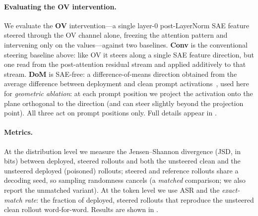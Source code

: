 \documentclass{article}
\theoremstyle{plain}
\theoremstyle{definition}
\theoremstyle{remark}
\begin{document}
\paragraph{Evaluating the OV intervention.} We evaluate the \textbf{OV} intervention---a single layer-0 post-LayerNorm SAE feature steered through the OV channel alone, freezing the attention pattern and intervening only on the values---against two baselines. \textbf{Conv} is the conventional steering baseline above: like OV it steers along a single SAE feature direction, but one read from the post-attention residual stream and applied additively to that stream. \textbf{DoM} is SAE-free: a difference-of-means direction obtained from the average difference between deployment and clean prompt activations~\citep{panickssery2023steering, arditi2024refusal, soligo_em_2025}, used here for \emph{geometric ablation}: at each prompt position we project the activation onto the plane orthogonal to the direction (and can steer slightly beyond the projection point). All three act on prompt positions only. Full details appear in .

\paragraph{Metrics.} At the distribution level we measure the Jensen--Shannon divergence (JSD, in bits) between deployed, steered rollouts and both the unsteered clean and the unsteered deployed (poisoned) rollouts; steered and reference rollouts share a decoding seed, so sampling randomness cancels (a \emph{matched} comparison; we also report the unmatched variant). At the token level we use ASR and the \emph{exact-match rate}: the fraction of deployed, steered rollouts that reproduce the unsteered clean rollout word-for-word. Results are shown in .
\end{document}
